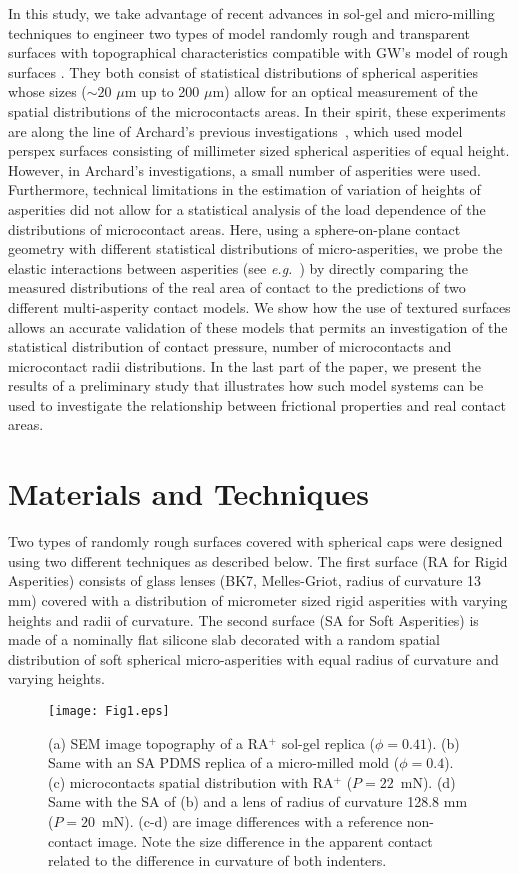 \documentclass[pre,groupedaddress,showkeys,showpacs,twocolumn]{revtex4}
\begin{document}
\indent In this study, we take advantage of recent advances in sol-gel and micro-milling techniques to engineer two types of model randomly rough and transparent surfaces with topographical characteristics compatible with GW's model of rough surfaces \cite{Greenwood1966}. They both consist of statistical distributions of spherical asperities whose sizes ($\sim 20$ $\mu$m up to  200 $\mu$m) allow for an optical measurement of the spatial distributions of the microcontacts areas. In their spirit, these experiments are along the line of Archard's previous investigations~\cite{archard1957}, which used model perspex surfaces consisting of millimeter sized spherical asperities of equal height. However, in Archard's investigations, a small number of asperities were used. Furthermore, technical limitations in the estimation of variation of heights of asperities did not allow for a statistical analysis of the load dependence of the distributions of microcontact areas. Here, using a sphere-on-plane contact geometry 
with different statistical distributions of micro-asperities, we probe the elastic interactions between asperities (see \textit{e.g.}~\cite{greenwood1967,ciavarella2006,ciavarella2008,guidoni2010}) by directly comparing the measured distributions of the real area of contact to the predictions of two different multi-asperity contact models. We show how the use of textured surfaces allows an accurate validation of these models that permits an investigation of the statistical distribution of contact pressure, number of microcontacts and microcontact radii distributions. In the last part of the paper, we present the results of a preliminary study that illustrates how such model systems can be used to investigate the relationship between frictional properties and real contact areas.\\
%
\section*{Materials and Techniques}
Two types of randomly rough surfaces covered with spherical caps were designed using two different techniques as described below. The first surface (RA for Rigid Asperities) consists of glass lenses (BK7, Melles-Griot, radius of curvature 13 mm) covered with a distribution of micrometer sized rigid asperities with varying heights and radii of curvature. The second surface (SA for Soft Asperities) is made of a nominally flat silicone slab decorated with a random spatial distribution of soft spherical micro-asperities with equal radius of curvature and varying heights.
%
\begin{figure}[ht]
	\centering
	\texttt{[image: Fig1.eps]}
	\caption{(a) SEM image topography of a RA$^+$ sol-gel replica ($\phi=0.41$). (b) Same with an SA PDMS replica of a micro-milled mold ($\phi=0.4$). (c) microcontacts spatial distribution with RA$^+$ ($P = 22$~mN). (d) Same with the SA of (b) and a lens of radius of curvature 128.8 mm ($P = 20$~mN). (c-d) are image differences with a reference non-contact image. Note the size difference in the apparent contact related to the difference in curvature of both indenters.}
	\label{fig:sem} 
\end{figure}
%
\end{document}
